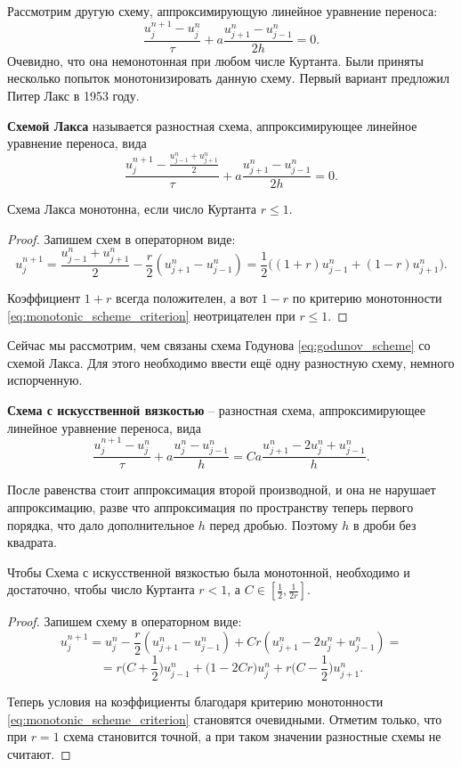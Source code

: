 \documentclass[../main.tex]{subfile}
\begin{document}
Рассмотрим другую схему, аппроксимирующую линейное уравнение переноса:
\[\frac{u_j^{n+1}-u_j^n}{\tau}+a\frac{u_{j+1}^n-u_{j-1}^n}{2h}=0.\]
Очевидно, что она немонотонная при любом числе Куртанта. Были приняты несколько
попыток монотонизировать данную схему. Первый вариант предложил Питер Лакс в
1953 году.

\begin{define}\label{eq:lax_scheme}
	\textbf{Схемой Лакса} называется разностная схема, аппроксимирующее
	линейное уравнение переноса, вида
	\[\frac{u_j^{n+1}-\frac{u_{j-1}^n+u_{j+1}^n}{2}}{\tau}+
	a\frac{u_{j+1}^n-u_{j-1}^n}{2h}=0.\]
\end{define}

\begin{lemma}
	Схема Лакса монотонна, если число Куртанта $r\le 1$.
\end{lemma}

\begin{proof}
	Запишем схем в операторном виде:
	\[u_j^{n+1}=\frac{u_{j-1}^n+u_{j+1}^n}{2}-
	\frac{r}{2}(u_{j+1}^n-u_{j-1}^n)=
	\frac{1}{2}\big((1+r)u_{j-1}^n+(1-r)u_{j+1}^n\big).\]

	Коэффициент $1+r$ всегда положителен, а вот $1-r$ по критерию
	монотонности \eqref{eq:monotonic_scheme_criterion} неотрицателен при
	$r\le 1$.
\end{proof}

Сейчас мы рассмотрим, чем связаны схема Годунова \eqref{eq:godunov_scheme} со
схемой Лакса. Для этого необходимо ввести ещё одну разностную схему, немного
испорченную.

\begin{define}\label{eq:god_lax_scheme}
	\textbf{Схема с искусственной вязкостью} -- разностная схема,
	аппроксимирующее линейное уравнение переноса, вида
	\[\frac{u_j^{n+1}-u_j^n}{\tau}+a\frac{u_j^n-u_{j-1}^n}{h}=
	Ca\frac{u_{j+1}^n-2u_j^n+u_{j-1}^n}{h}.\]
\end{define}

После равенства стоит аппроксимация второй производной, и она не нарушает
аппроксимацию, разве что аппроксимация по пространству теперь первого порядка,
что дало дополнительное $h$ перед дробью. Поэтому $h$ в дроби без квадрата.

\begin{lemma}
	Чтобы Схема с искусственной вязкостью была монотонной, необходимо
	и достаточно, чтобы число Куртанта $r<1$, а
	$C\in[\frac{1}{2},\frac{1}{2r}]$.
\end{lemma}

\begin{proof}
	Запишем схему в операторном виде:
	\[u_j^{n+1}=u_j^n-\frac{r}{2}(u_{j+1}^n-u_{j-1}^n)+Cr(u_{j+1}^n-2u_j^n+
	u_{j-1}^n)=\]
	\[=r\Big(C+\frac{1}{2}\Big)u_{j-1}^n+\Big(1-2Cr\Big)u_j^n+r\Big(C-
	\frac{1}{2}\Big)u_{j+1}^n.\]

	Теперь условия на коэффициенты благодаря критерию монотонности
	\eqref{eq:monotonic_scheme_criterion} становятся очевидными.
	Отметим только, что при $r=1$ схема становится точной, а при таком
	значении разностные схемы не считают.
\end{proof}
\end{document}
